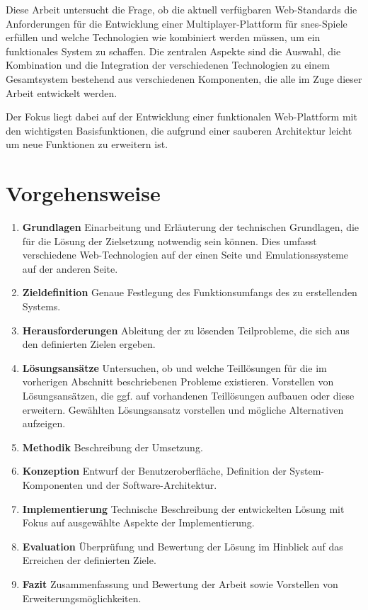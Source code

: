 Diese Arbeit untersucht die Frage, ob die aktuell verfügbaren
Web-Standards die Anforderungen für die Entwicklung einer
Multiplayer-Plattform für \gls{snes}-Spiele erfüllen und welche
Technologien wie kombiniert werden müssen, um ein funktionales System zu
schaffen. Die zentralen Aspekte sind die Auswahl, die Kombination und
die Integration der verschiedenen Technologien zu einem Gesamtsystem
bestehend aus verschiedenen Komponenten, die alle im Zuge dieser Arbeit
entwickelt werden.

Der Fokus liegt dabei auf der Entwicklung einer funktionalen
Web-Plattform mit den wichtigsten Basisfunktionen, die aufgrund einer
sauberen Architektur leicht um neue Funktionen zu erweitern ist.

\section{Vorgehensweise}\label{vorgehensweise}

\begin{enumerate}
\def\labelenumi{\arabic{enumi}.}
\tightlist
\item
  \textbf{Grundlagen} Einarbeitung und Erläuterung der technischen
  Grundlagen, die für die Lösung der Zielsetzung notwendig sein können.
  Dies umfasst verschiedene Web-Technologien auf der einen Seite und
  Emulationssysteme auf der anderen Seite.
\item
  \textbf{Zieldefinition} Genaue Festlegung des Funktionsumfangs des zu
  erstellenden Systems.
\item
  \textbf{Herausforderungen} Ableitung der zu lösenden Teilprobleme, die
  sich aus den definierten Zielen ergeben.
\item
  \textbf{Lösungsansätze} Untersuchen, ob und welche Teillösungen für
  die im vorherigen Abschnitt beschriebenen Probleme existieren.
  Vorstellen von Lösungsansätzen, die ggf. auf vorhandenen Teillösungen
  aufbauen oder diese erweitern. Gewählten Lösungsansatz vorstellen und
  mögliche Alternativen aufzeigen.
\item
  \textbf{Methodik} Beschreibung der Umsetzung.
\item
  \textbf{Konzeption} Entwurf der Benutzeroberfläche, Definition der
  System-Komponenten und der Software-Architektur.
\item
  \textbf{Implementierung} Technische Beschreibung der entwickelten
  Lösung mit Fokus auf ausgewählte Aspekte der Implementierung.
\item
  \textbf{Evaluation} Überprüfung und Bewertung der Lösung im Hinblick
  auf das Erreichen der definierten Ziele.
\item
  \textbf{Fazit} Zusammenfassung und Bewertung der Arbeit sowie
  Vorstellen von Erweiterungsmöglichkeiten.
\end{enumerate}

